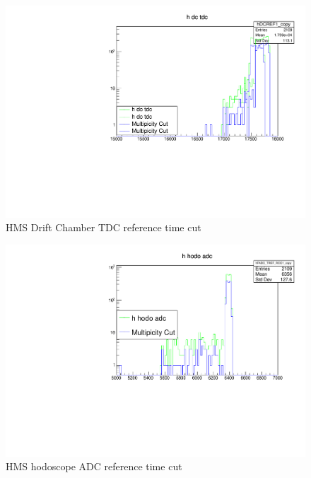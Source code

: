 \documentclass[10pt]{beamer}
\begin{document}
\begin{frame}{}
    \begin{figure}
    \centering
    \includegraphics[width=\textwidth]{h_dc_tdc.pdf}
    \caption{HMS Drift Chamber TDC reference time cut}
\end{figure}{}
\end{frame}{}

\begin{frame}{}
    \begin{figure}
    \centering
    \includegraphics[width=\textwidth]{h_hodo_adc.pdf}
    \caption{HMS hodoscope ADC reference time cut}
\end{figure}{}
\end{frame}{}
\end{document}
